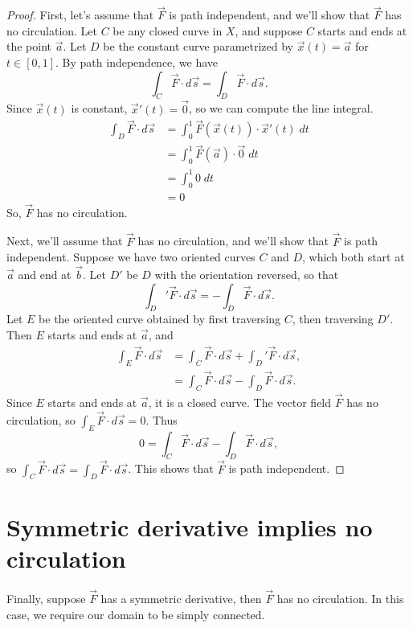 \documentclass{ximera}
\begin{document}
\begin{proof}
First, let's assume that $\vec{F}$ is path independent, and we'll show that $\vec{F}$ has no circulation. Let $C$ be any closed curve in $X$, and suppose $C$ starts and ends at the point $\vec{a}$. Let $D$ be the constant curve parametrized by $\vec{x}(t) = \vec{a}$ for $t\in [0,1]$. By path independence, we have
\[
\int_C \vec{F}\cdot d\vec{s} = \int_D \vec{F}\cdot d\vec{s}.
\]
Since $\vec{x}(t)$ is constant, $\vec{x}'(t) = \vec{0}$, so we can compute the line integral.
\begin{align*}
\int_D \vec{F}\cdot d\vec{s} &= \int_0^1 \vec{F}(\vec{x}(t))\cdot \vec{x}'(t)\;dt\\
&= \int_0^1 \vec{F}(\vec{a})\cdot \vec{0}\;dt\\
&= \int_0^1 0\;dt\\
&= 0
\end{align*}
So, $\vec{F}$ has no circulation.

Next, we'll assume that $\vec{F}$ has no circulation, and we'll show that $\vec{F}$ is path independent. Suppose we have two oriented curves $C$ and $D$, which both start at $\vec{a}$ and end at $\vec{b}$. Let $D'$ be $D$ with the orientation reversed, so that
\[
\int_D' \vec{F}\cdot d\vec{s} = - \int_D \vec{F}\cdot d\vec{s}.
\]
Let $E$ be the oriented curve obtained by first traversing $C$, then traversing $D'$. Then $E$ starts and ends at $\vec{a}$, and
\begin{align*}
\int_E \vec{F}\cdot d\vec{s} &= \int_C \vec{F}\cdot d\vec{s} + \int_D' \vec{F}\cdot d\vec{s},\\
&= \int_C \vec{F}\cdot d\vec{s} - \int_D \vec{F}\cdot d\vec{s}.
\end{align*}
Since $E$ starts and ends at $\vec{a}$, it is a closed curve. The vector field $\vec{F}$ has no circulation, so $\int_E \vec{F}\cdot d\vec{s} = 0$. Thus
\[
0 = \int_C \vec{F}\cdot d\vec{s} - \int_D \vec{F}\cdot d\vec{s},
\]
so $\int_C \vec{F}\cdot d\vec{s} = \int_D \vec{F}\cdot d\vec{s}$. This shows that $\vec{F}$ is path independent.
\end{proof}

\section*{Symmetric derivative implies no circulation}

Finally, suppose $\vec{F}$ has a symmetric derivative, then $\vec{F}$ has no circulation. In this case, we require our domain to be simply connected.
\end{document}
